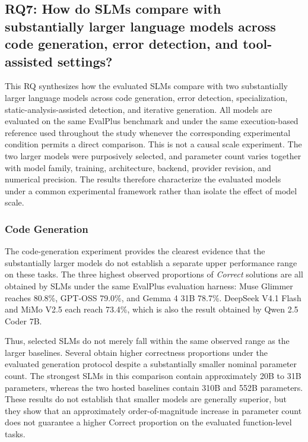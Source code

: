 \subsection{RQ7: How do SLMs compare with substantially larger language models across code generation, error detection, and tool-assisted settings?}
\label{sec:rq7}

This RQ synthesizes how the evaluated SLMs compare with two substantially larger language models across code generation, error detection, specialization, static-analysis-assisted detection, and iterative generation. All models are evaluated on the same EvalPlus benchmark and under the same execution-based reference used throughout the study whenever the corresponding experimental condition permits a direct comparison. This is not a causal scale experiment. The two larger models were purposively selected, and parameter count varies together with model family, training, architecture, backend, provider revision, and numerical precision. The results therefore characterize the evaluated models under a common experimental framework rather than isolate the effect of model scale.

\subsubsection{Code Generation}

The code-generation experiment provides the clearest evidence that the substantially larger models do not establish a separate upper performance range on these tasks. The three highest observed proportions of \emph{Correct} solutions are all obtained by SLMs under the same EvalPlus evaluation harness: Muse Glimmer reaches 80.8\%, GPT-OSS 79.0\%, and Gemma 4 31B 78.7\%. DeepSeek V4.1 Flash and MiMo V2.5 each reach 73.4\%, which is also the result obtained by Qwen 2.5 Coder 7B.

Thus, selected SLMs do not merely fall within the same observed range as the larger baselines. Several obtain higher correctness proportions under the evaluated generation protocol despite a substantially smaller nominal parameter count. The strongest SLMs in this comparison contain approximately 20B to 31B parameters, whereas the two hosted baselines contain 310B and 552B parameters. These results do not establish that smaller models are generally superior, but they show that an approximately order-of-magnitude increase in parameter count does not guarantee a higher Correct proportion on the evaluated function-level tasks.

